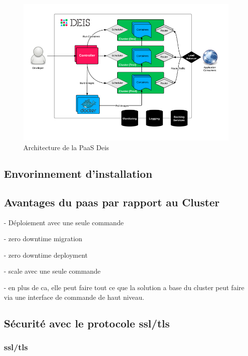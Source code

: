 \begin{onehalfspace}
\begin{figure}[H]
\centering
\includegraphics [scale=0.55]{chapitre5/assets/deis-architecture}
\caption{Architecture de la PaaS Deis}
\label{fig:deis-architecture}
\end{figure}


\subsection{Envorinnement d'installation}

\subsection{Avantages du \acrshort{paas} par rapport au Cluster}

- Déploiement avec une seule commande

- zero downtime migration

- zero downtime deployment

- scale avec une seule commande

- en plus de ca, elle peut faire tout ce que la solution a base du cluster peut faire via une interface de commande de haut niveau.




\subsection{Sécurité avec le protocole \acrshort{ssl}/\acrshort{tls}}

\subsubsection{\acrshort{ssl}/\acrshort{tls}}


\end{onehalfspace}
